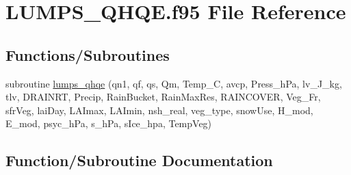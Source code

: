 \hypertarget{_l_u_m_p_s___q_h_q_e_8f95}{}\section{L\+U\+M\+P\+S\+\_\+\+Q\+H\+Q\+E.\+f95 File Reference}
\label{_l_u_m_p_s___q_h_q_e_8f95}
\subsection*{Functions/\+Subroutines}
\begin{DoxyCompactItemize}
\item 
subroutine \hyperlink{_l_u_m_p_s___q_h_q_e_8f95_af6b781cbbc71c67d4bb5de9dcb066b01}{lumps\+\_\+qhqe} (qn1, qf, qs, Qm, Temp\+\_\+C, avcp, Press\+\_\+h\+Pa, lv\+\_\+\+J\+\_\+kg, tlv, D\+R\+A\+I\+N\+RT, Precip, Rain\+Bucket, Rain\+Max\+Res, R\+A\+I\+N\+C\+O\+V\+ER, Veg\+\_\+\+Fr, sfr\+Veg, lai\+Day, L\+A\+Imax, L\+A\+Imin, nsh\+\_\+real, veg\+\_\+type, snow\+Use, H\+\_\+mod, E\+\_\+mod, psyc\+\_\+h\+Pa, s\+\_\+h\+Pa, s\+Ice\+\_\+hpa, Temp\+Veg)
\end{DoxyCompactItemize}


\subsection{Function/\+Subroutine Documentation}
\mbox{\label{_l_u_m_p_s___q_h_q_e_8f95_af6b781cbbc71c67d4bb5de9dcb066b01}} 

